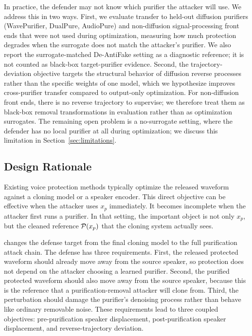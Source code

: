 In practice, the defender may not know which purifier the attacker will use. We address this in two ways. 
First, we evaluate transfer to held-out diffusion purifiers (WavePurifier, DualPure, AudioPure) and non-diffusion signal-processing front ends that were not used during optimization, 
measuring how much protection degrades when the surrogate does not match the attacker's purifier. 
We also report the surrogate-matched De-AntiFake setting as a diagnostic reference; it is not counted as black-box target-purifier evidence. 
Second, the trajectory-deviation objective targets the structural behavior of diffusion reverse processes rather than the specific weights of one model, 
which we hypothesize improves cross-purifier transfer compared to output-only optimization. 
For non-diffusion front ends, there is no reverse trajectory to supervise; we therefore treat them as black-box removal transformations in evaluation rather than as optimization surrogates. 
The remaining open problem is a no-surrogate setting, where the defender has no local purifier at all during optimization; we discuss this limitation in Section~\ref{sec:limitations}.

\subsection{Design Rationale}

Existing voice protection methods typically optimize the released waveform against a cloning model or a speaker encoder. 
This direct objective can be effective when the attacker uses $x_p$ immediately. 
It becomes incomplete when the attacker first runs a purifier. 
In that setting, the important object is not only $x_p$, but the cleaned reference $\mathcal{P}(x_p)$ that the cloning system actually sees.

\method{} changes the defense target from the final cloning model to the full purification attack chain. 
The defense has three requirements. First, the released protected waveform should already move away from the source speaker, so protection does not depend on the attacker choosing a learned purifier. 
Second, the purified protected waveform should also move away from the source speaker, because this is the reference that a purification-removal attacker will clone from. 
Third, the perturbation should damage the purifier's denoising process rather than behave like ordinary removable noise. 
These requirements lead to three coupled objectives: pre-purification speaker displacement, post-purification speaker displacement, and reverse-trajectory deviation.


